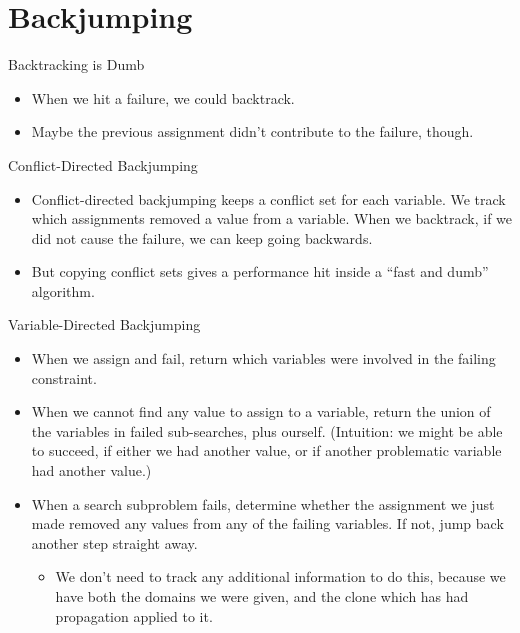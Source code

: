 \documentclass{beamer}
\begin{document}
\section{Backjumping}

\begin{frame}{Backtracking is Dumb}
    \begin{itemize}
        \item When we hit a failure, we could backtrack.
        \item Maybe the previous assignment didn't contribute to the failure, though.
    \end{itemize}
\end{frame}

\begin{frame}{Conflict-Directed Backjumping}
    \begin{itemize}
        \item Conflict-directed backjumping keeps a conflict set for each variable. We track
            which assignments removed a value from a variable. When we backtrack, if we did not
            cause the failure, we can keep going backwards.

        \item But copying conflict sets gives a performance hit inside a ``fast and dumb''
            algorithm.
    \end{itemize}
\end{frame}

\begin{frame}{Variable-Directed Backjumping}
    \begin{itemize}
        \item When we assign and fail, return which variables were involved in the failing
            constraint.

        \item When we cannot find any value to assign to a variable, return the union of the
            variables in failed sub-searches, plus ourself. (Intuition: we might be able to
            succeed, if either we had another value, or if another problematic variable had
            another value.)

        \item When a search subproblem fails, determine whether the assignment we just made
            removed any values from any of the failing variables. If not, jump back another step
            straight away.

            \begin{itemize}
                \item We don't need to track any additional information to do this, because we
                    have both the domains we were given, and the clone which has had propagation
                    applied to it.
            \end{itemize}
    \end{itemize}
\end{frame}
\end{document}
